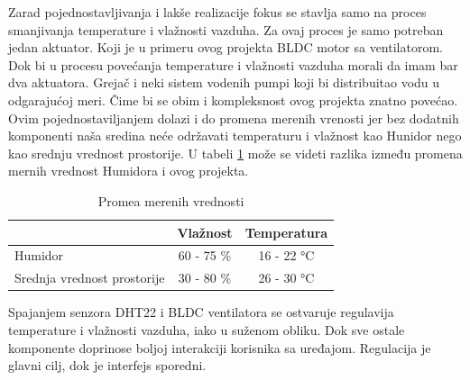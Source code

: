 \documentclass[a4paper, 12pt]{article}
\begin{document}
\vspace{10pt}

Zarad pojednostavljivanja i lakše realizacije fokus se stavlja samo na proces smanjivanja temperature i vlažnosti vazduha. Za ovaj proces je samo potreban jedan aktuator. Koji je u primeru ovog projekta BLDC motor sa ventilatorom. Dok bi u procesu povećanja temperature i vlažnosti vazduha morali da imam bar dva aktuatora. Grejač i neki sistem vodenih pumpi koji bi distribuitao vodu u odgarajućoj meri. Čime bi se obim i kompleksnost ovog projekta znatno povećao. Ovim pojednostaviljanjem dolazi i do promena merenih vrenosti jer bez dodatnih komponenti naša sredina neće održavati temperaturu i vlažnost kao Hunidor nego kao srednju vrednost prostorije. U tabeli \ref{tabela-1} može se videti razlika između promena mernih vrednost Humidora i ovog projekta.

\vspace{10pt}

\begin{table}[H]
\centering
\begin{tabular}{|l|c|c|}
\hline
& Vlažnost & Temperatura\\
\hline
Humidor & 60 - 75 \% & 16 - 22 °C\\
\hline
Srednja vrednost prostorije & 30 - 80 \% & 26 - 30 °C\\
\hline
\end{tabular}
\caption{Promea merenih vrednosti} \label{tabela-1}
\end{table}

Spajanjem senzora DHT22 i BLDC ventilatora se ostvaruje regulavija temperature i vlažnosti vazduha, iako u suženom obliku. Dok sve ostale komponente doprinose boljoj interakciji korisnika sa uređajom. Regulacija je glavni cilj, dok je interfejs sporedni.

%
%
\end{document}
